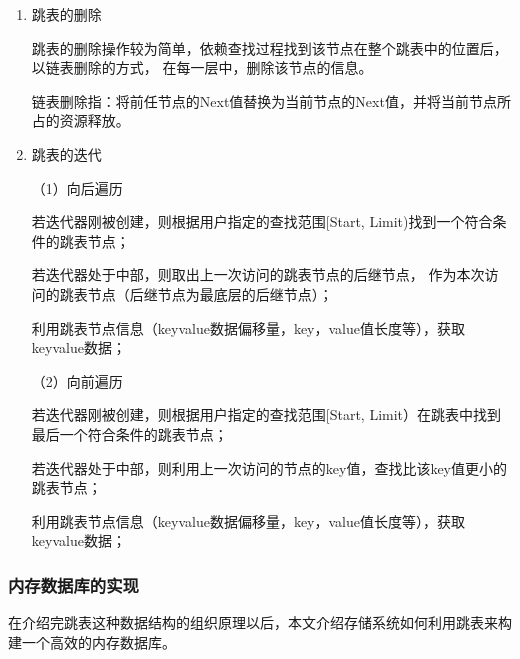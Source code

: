 \begin{enumerate}
		\item 跳表的删除

		跳表的删除操作较为简单，依赖查找过程找到该节点在整个跳表中的位置后，以链表删除的方式，
		在每一层中，删除该节点的信息。

		链表删除指：将前任节点的Next值替换为当前节点的Next值，并将当前节点所占的资源释放。

		\item 跳表的迭代
		
		（1）向后遍历

		若迭代器刚被创建，则根据用户指定的查找范围[Start, Limit)找到一个符合条件的跳表节点；
		
		若迭代器处于中部，则取出上一次访问的跳表节点的后继节点，
		作为本次访问的跳表节点（后继节点为最底层的后继节点）；
		
		利用跳表节点信息（keyvalue数据偏移量，key，value值长度等），获取keyvalue数据；
		
		（2）向前遍历

		若迭代器刚被创建，则根据用户指定的查找范围[Start, Limit）在跳表中找到最后一个符合条件的跳表节点；
		
		若迭代器处于中部，则利用上一次访问的节点的key值，查找比该key值更小的跳表节点；
		
		利用跳表节点信息（keyvalue数据偏移量，key，value值长度等），获取keyvalue数据；

	\end{enumerate}

		\subsubsection{内存数据库的实现}

		在介绍完跳表这种数据结构的组织原理以后，本文介绍存储系统如何利用跳表来构建一个高效的内存数据库。

